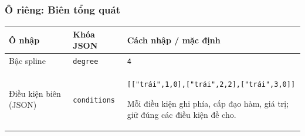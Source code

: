 \subsubsection*{Ô riêng: Biên tổng quát}
\begin{center}\small\begin{tabular}{@{}p{.32\linewidth}p{.17\linewidth}p{.43\linewidth}@{}}\toprule
Ô nhập & Khóa JSON & Cách nhập / mặc định\\\midrule
Bậc spline & \texttt{degree} & \texttt{4}\\[3pt]
Điều kiện biên (JSON) & \texttt{conditions} & \texttt{[["trái",\allowbreak{}1,\allowbreak{}0],\allowbreak{}["trái",\allowbreak{}2,\allowbreak{}2],\allowbreak{}["trái",\allowbreak{}3,\allowbreak{}0]]}
\par Mỗi điều kiện ghi phía,\allowbreak{} cấp đạo hàm,\allowbreak{} giá trị;\allowbreak{} giữ đúng các điều kiện đề cho.\\[3pt]
\bottomrule\end{tabular}\end{center}
